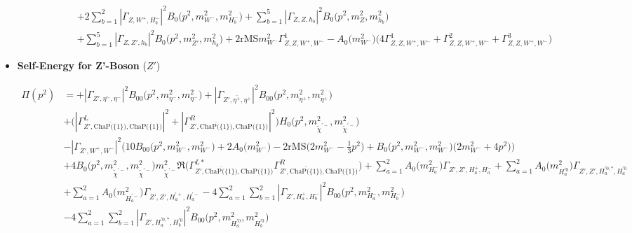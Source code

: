 \begin{itemize}
\begin{align}
 &+2 \sum_{b=1}^{2}|{\Gamma_{Z,W^+,H^-_{{b}}}}|^2 {B_0\Big(p^{2},m^2_{W^-},m^2_{H^-_{{b}}}\Big)}  +\sum_{b=1}^{5}|{\Gamma_{Z,Z,h_{{b}}}}|^2 {B_0\Big(p^{2},m^2_{Z},m^2_{h_{{b}}}\Big)} \nonumber \\ 
 &+\sum_{b=1}^{5}|{\Gamma_{Z,{Z'},h_{{b}}}}|^2 {B_0\Big(p^{2},m^2_{{Z'}},m^2_{h_{{b}}}\Big)} +2 \text{rMS} m^2_{W^-} {\Gamma^{1}_{Z,Z,W^+,W^-}} - {A_0\Big(m^2_{W^-}\Big)} \Big(4 {\Gamma^{1}_{Z,Z,W^+,W^-}}  + {\Gamma^{2}_{Z,Z,W^+,W^-}} + {\Gamma^{3}_{Z,Z,W^+,W^-}}\Big) 
\end{align} 
\item {\bf Self-Energy for Z'-Boson} \thickspace (\({Z'}\)) 

\begin{align} 
\Pi(p^2) &= +|{\Gamma_{{Z'},\bar{\eta^-},\eta^-}}|^2 {B_{00}\Big(p^{2},m^2_{\eta^-},m^2_{\eta^-}\Big)} +|{\Gamma_{{Z'},\bar{\eta^+},\eta^+}}|^2 {B_{00}\Big(p^{2},m^2_{\eta^+},m^2_{\eta^+}\Big)} \nonumber \\ 
 &+\Big(|{\Gamma^L_{{Z'},\bar{\text{ChaP}\Big(\{1\}\Big)},\text{ChaP}\Big(\{1\}\Big)}}|^2 + |{\Gamma^R_{{Z'},\bar{\text{ChaP}\Big(\{1\}\Big)},\text{ChaP}\Big(\{1\}\Big)}}|^2\Big){H_0\Big(p^{2},m^2_{\tilde{\chi}^{'-}},m^2_{\tilde{\chi}^{'-}}\Big)} \nonumber \\ 
 &- |{\Gamma_{{Z'},W^+,W^-}}|^2 \Big(10 {B_{00}\Big(p^{2},m^2_{W^-},m^2_{W^-}\Big)}  + 2 {A_0\Big(m^2_{W^-}\Big)}  -2 \text{rMS} \Big(2 m^2_{W^-}  -\frac{1}{3} p^{2} \Big) + {B_0\Big(p^{2},m^2_{W^-},m^2_{W^-}\Big)} \Big(2 m^2_{W^-}  + 4 p^{2} \Big)\Big)\nonumber \\ 
 &+4 {B_0\Big(p^{2},m^2_{\tilde{\chi}^{'-}},m^2_{\tilde{\chi}^{'-}}\Big)} m_{\tilde{\chi}^{'-}}^{2} {\Re\Big({\Gamma^{L*}_{{Z'},\bar{\text{ChaP}\Big(\{1\}\Big)},\text{ChaP}\Big(\{1\}\Big)}} {\Gamma^R_{{Z'},\bar{\text{ChaP}\Big(\{1\}\Big)},\text{ChaP}\Big(\{1\}\Big)}} \Big)} +\sum_{a=1}^{2}{A_0\Big(m^2_{H^-_{{a}}}\Big)} {\Gamma_{{Z'},{Z'},H^+_{{a}},H^-_{{a}}}} +\sum_{a=1}^{2}{A_0\Big(m^2_{H^{'0}_{{a}}}\Big)} {\Gamma_{{Z'},{Z'},H^{{'0},*}_{{a}},H^{'0}_{{a}}}} \nonumber \\ 
 &+\sum_{a=1}^{2}{A_0\Big(m^2_{H^{'-}_{{a}}}\Big)} {\Gamma_{{Z'},{Z'},H^{'+}_{{a}},H^{'-}_{{a}}}} -4 \sum_{a=1}^{2}\sum_{b=1}^{2}|{\Gamma_{{Z'},H^+_{{a}},H^-_{{b}}}}|^2 {B_{00}\Big(p^{2},m^2_{H^-_{{a}}},m^2_{H^-_{{b}}}\Big)}  \nonumber \\ 
 &-4 \sum_{a=1}^{2}\sum_{b=1}^{2}|{\Gamma_{{Z'},H^{{'0},*}_{{a}},H^{'0}_{{b}}}}|^2 {B_{00}\Big(p^{2},m^2_{H^{'0}_{{a}}},m^2_{H^{'0}_{{b}}}\Big)}  \nonumber \\ 

\end{align}
\end{itemize}
